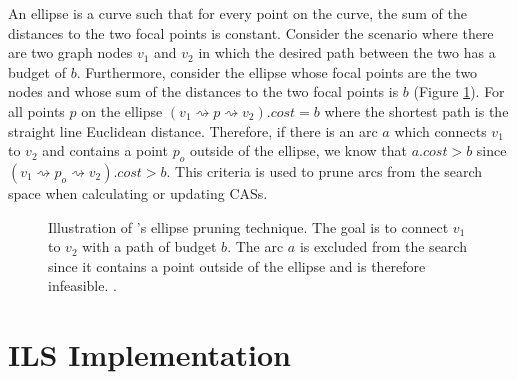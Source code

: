 \documentclass[11pt]{article}
\newcommand{\spa}{\rightsquigarrow}
\begin{document}
An ellipse is a curve such that for every point on the curve, the sum of the distances to the two focal points is constant. Consider the scenario where there are two graph nodes $v_1$ and $v_2$ in which the desired path between the two has a budget of $b$. Furthermore, consider the ellipse whose focal points are the two nodes and whose sum of the distances to the two focal points is $b$ (Figure \ref{fig:ellipse}). For all points $p$ on the ellipse $(v_1 \spa p \spa v_2).cost = b$ where the shortest path is the straight line Euclidean distance. Therefore, if there is an arc $a$ which connects $v_1$ to $v_2$ and contains a point $p_o$ outside of the ellipse, we know that $a.cost > b$ since $(v_1 \spa p_o \spa v_2).cost > b$. This criteria is used to prune arcs from the search space when calculating or updating CASs.

\begin{figure}[!h]
\begin{center}
\end{center}
\caption{Illustration of \citeauthor{lu2015arc}'s ellipse pruning technique. The goal is to connect $v_1$ to $v_2$ with a path of budget $b$. The arc $a$ is excluded from the search since it contains a point outside of the ellipse and is therefore infeasible. \cite{lu2015arc}.}
\label{fig:ellipse}
\end{figure}



\section{ILS Implementation}
\end{document}

